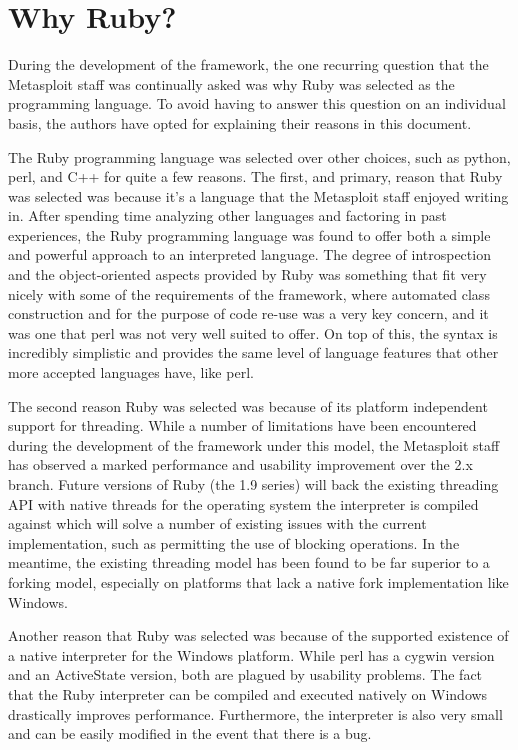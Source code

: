 \documentclass{report}
\begin{document}
    \section{Why Ruby?}

\par
During the development of the framework, the one recurring question
that the Metasploit staff was continually asked was why Ruby was
selected as the programming language.  To avoid having to answer
this question on an individual basis, the authors have opted for
explaining their reasons in this document.

\par
The Ruby programming language was selected over other choices, such
as python, perl, and C++ for quite a few reasons.  The first, and
primary, reason that Ruby was selected was because it's a language
that the Metasploit staff enjoyed writing in.  After spending time
analyzing other languages and factoring in past experiences, the
Ruby programming language was found to offer both a simple and
powerful approach to an interpreted language.  The degree of
introspection and the object-oriented aspects provided by Ruby was
something that fit very nicely with some of the requirements of the
framework, where automated class construction and for the purpose of
code re-use was a very key concern, and it was one that perl was not
very well suited to offer. On top of this, the syntax is incredibly
simplistic and provides the same level of language features that
other more accepted languages have, like perl.

\par
The second reason Ruby was selected was because of its platform
independent support for threading.  While a number of limitations
have been encountered during the development of the framework under
this model, the Metasploit staff has observed a marked performance
and usability improvement over the 2.x branch.  Future versions of
Ruby (the 1.9 series) will back the existing threading API with
native threads for the operating system the interpreter is compiled
against which will solve a number of existing issues with the
current implementation, such as permitting the use of blocking
operations.  In the meantime, the existing threading model has been
found to be far superior to a forking model, especially on platforms
that lack a native fork implementation like Windows.

\par
Another reason that Ruby was selected was because of the supported
existence of a native interpreter for the Windows platform.  While
perl has a cygwin version and an ActiveState version, both are
plagued by usability problems.  The fact that the Ruby interpreter
can be compiled and executed natively on Windows drastically
improves performance.  Furthermore, the interpreter is also very
small and can be easily modified in the event that there is a bug.
\end{document}
